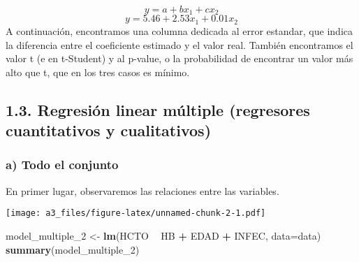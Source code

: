 \documentclass[]{article}
\newenvironment{Shaded}{\begin{snugshade}}{\end{snugshade}}
\newcommand{\DataTypeTok}[1]{\textcolor[rgb]{0.13,0.29,0.53}{#1}}
\newcommand{\DecValTok}[1]{\textcolor[rgb]{0.00,0.00,0.81}{#1}}
\newcommand{\KeywordTok}[1]{\textcolor[rgb]{0.13,0.29,0.53}{\textbf{#1}}}
\newcommand{\NormalTok}[1]{#1}
\newcommand{\OperatorTok}[1]{\textcolor[rgb]{0.81,0.36,0.00}{\textbf{#1}}}
\newcommand{\StringTok}[1]{\textcolor[rgb]{0.31,0.60,0.02}{#1}}
\begin{document}
\[y = a + bx_1 + cx_2\] \[y = 5.46 + 2.53x_1 + 0.01x_2\] A continuación,
encontramos una columna dedicada al error estandar, que indica la
diferencia entre el coeficiente estimado y el valor real. También
encontramos el valor t (e en t-Student) y al p-value, o la probabilidad
de encontrar un valor más alto que t, que en los tres casos es mínimo.

\hypertarget{regresiuxf3n-linear-muxfaltiple-regresores-cuantitativos-y-cualitativos}{%
\subsection{1.3. Regresión linear múltiple (regresores cuantitativos y
cualitativos)}\label{regresiuxf3n-linear-muxfaltiple-regresores-cuantitativos-y-cualitativos}}

\hypertarget{a-todo-el-conjunto}{%
\subsubsection{a) Todo el conjunto}\label{a-todo-el-conjunto}}

En primer lugar, observaremos las relaciones entre las variables.

\begin{Shaded}
\end{Shaded}

\texttt{[image: a3\_files/figure-latex/unnamed-chunk-2-1.pdf]}

\begin{Shaded}
\begin{Highlighting}[]
\NormalTok{model_multiple_}\DecValTok{2}\NormalTok{ <-}\StringTok{ }\KeywordTok{lm}\NormalTok{(HCTO }\OperatorTok{~}\StringTok{ }\NormalTok{HB }\OperatorTok{+}\StringTok{ }\NormalTok{EDAD }\OperatorTok{+}\StringTok{ }\NormalTok{INFEC, }\DataTypeTok{data=}\NormalTok{data)}
\KeywordTok{summary}\NormalTok{(model_multiple_}\DecValTok{2}\NormalTok{)}
\end{Highlighting}
\end{Shaded}
\end{document}
